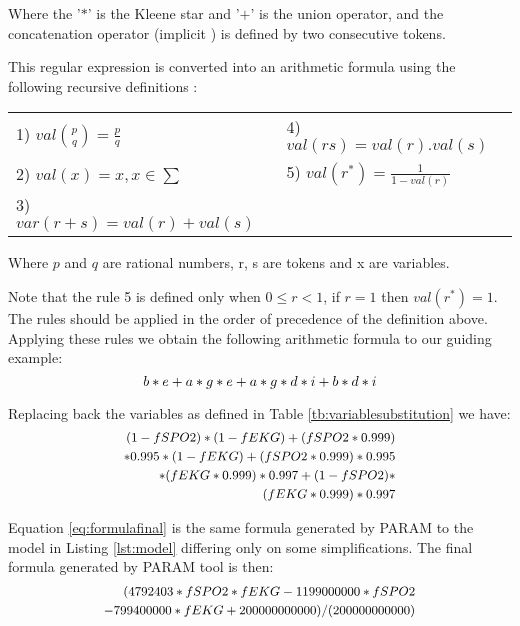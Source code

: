 \documentclass[conference]{IEEEtran}
\begin{document}
	Where the '$*$' is the Kleene star and '$+$' is the union operator, and the concatenation
	operator (implicit ) is defined  by two consecutive tokens.
	
	This regular expression is converted into an arithmetic formula using the following
	recursive definitions \cite{paramthesis}:	
		
	\begin{table}[!h]
	\begin{center}
	\footnotesize		
	\begin{tabular}{l|l}
	1) $val \binom{p}{q} = \frac{p}{q}$ &	4)	$val(rs) = val(r).val(s)$ \\ 
	2)	$val(x) = x, x \in  \sum$ &	5)	$val(r^{*}) = \frac{1}{1 - val(r)}$\\
	3)	$var(r+s) = val(r) + val(s)$	&	\\
	\end{tabular}
	\end{center}		
	\end{table}	
	
	Where $p$ and $q$ are rational numbers, r, s are tokens and
	x are variables.
		
	Note that the rule 5 is defined only when $0 \le r < 1$, if $r = 1$
	then $val(r^{*}) = 1$. The rules should be applied in the order of precedence
	of the definition above. Applying these rules we obtain the following arithmetic
	formula to our guiding example:
	\begin{equation}	
	\footnotesize
	\label{eq:formula}
	b*e + a*g*e + a*g*d*i + b*d*i
	\end{equation}
		
	Replacing back the variables as defined in Table \ref{tb:variablesubstitution}
	we have:	
	\begin{equation}
	\label{eq:formulafinal}
	\footnotesize
	\begin{split}
	(1-fSPO2)*(1-fEKG) + (fSPO2*0.999)\\
	*0.995*(1-fEKG) + (fSPO2*0.999)*0.995\\
	*(fEKG*0.999)*0.997 + (1-fSPO2)*\\
	(fEKG*0.999)*0.997
	\end{split}
	\end{equation}
	
	Equation \ref{eq:formulafinal} is the same formula
	generated by PARAM to the model in Listing \ref{lst:model} differing
	only on some simplifications. The final formula 
	generated by PARAM tool is then:		
	\begin{equation}
	\footnotesize
	\label{eq:formulaparam}
	\begin{split}
	(4792403*fSPO2*fEKG -1199000000*fSPO2\\
	-799400000*fEKG +200000000000) / (200000000000)
	\end{split}
	\end{equation}
	
\end{document}
